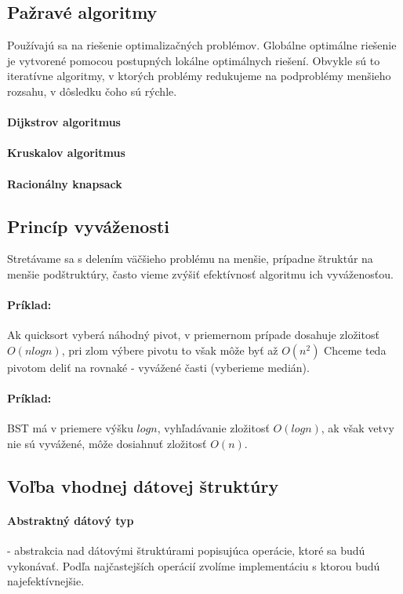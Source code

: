 	\subsection{Pažravé algoritmy}
		Používajú sa na riešenie optimalizačných problémov. Globálne optimálne riešenie je vytvorené pomocou postupných lokálne optimálnych riešení. Obvykle sú to iteratívne algoritmy, v ktorých problémy redukujeme na podproblémy menšieho rozsahu, v dôsledku čoho sú rýchle.
		\paragraph{Dijkstrov algoritmus}
		\paragraph{Kruskalov algoritmus}
		\paragraph{Racionálny knapsack}
	\subsection{Princíp vyváženosti}
		Stretávame sa s delením väčšieho problému na menšie, prípadne štruktúr na menšie podštruktúry, často vieme zvýšiť efektívnosť algoritmu ich vyváženosťou.
		\paragraph{Príklad:} Ak quicksort vyberá náhodný pivot, v priemernom prípade dosahuje zložitosť $O(n log n)$, pri zlom výbere pivotu to však môže byť až $O(n^{2})$ Chceme teda pivotom deliť na rovnaké - vyvážené časti (vyberieme medián).\\
		\paragraph{Príklad:} BST má v priemere výšku $log n$, vyhľadávanie zložitosť $O(log n)$, ak však vetvy nie sú vyvážené, môže dosiahnuť zložitosť $O(n)$.
	

	\subsection{Voľba vhodnej dátovej štruktúry}
		\paragraph{Abstraktný dátový typ} - abstrakcia nad dátovými štruktúrami popisujúca operácie, ktoré sa budú vykonávať. Podľa najčastejších operácií zvolíme implementáciu s ktorou budú najefektívnejšie.\\
		
